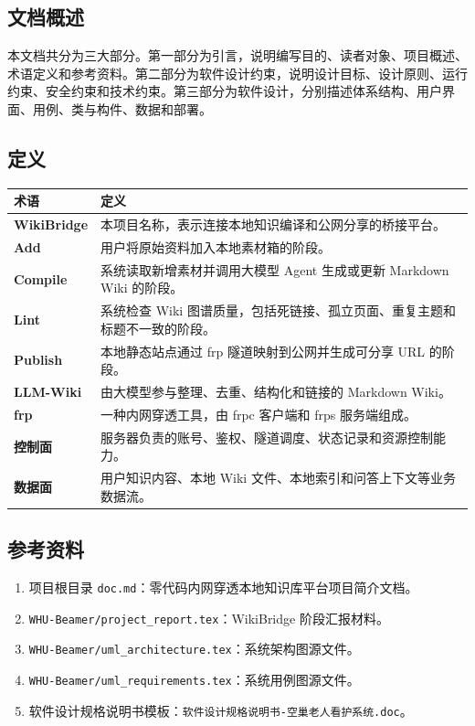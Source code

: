 \documentclass[UTF8,a4paper,12pt,fontset=fandol]{ctexart}
\newcommand{\code}[1]{\texttt{\footnotesize #1}}
\begin{document}
\subsection{文档概述}
本文档共分为三大部分。第一部分为引言，说明编写目的、读者对象、项目概述、术语定义和参考资料。第二部分为软件设计约束，说明设计目标、设计原则、运行约束、安全约束和技术约束。第三部分为软件设计，分别描述体系结构、用户界面、用例、类与构件、数据和部署。

\subsection{定义}
\begin{longtable}{>{\bfseries}p{3.2cm}p{11.0cm}}
\toprule
术语 & 定义 \\
\midrule
WikiBridge & 本项目名称，表示连接本地知识编译和公网分享的桥接平台。 \\
Add & 用户将原始资料加入本地素材箱的阶段。 \\
Compile & 系统读取新增素材并调用大模型 Agent 生成或更新 Markdown Wiki 的阶段。 \\
Lint & 系统检查 Wiki 图谱质量，包括死链接、孤立页面、重复主题和标题不一致的阶段。 \\
Publish & 本地静态站点通过 frp 隧道映射到公网并生成可分享 URL 的阶段。 \\
LLM-Wiki & 由大模型参与整理、去重、结构化和链接的 Markdown Wiki。 \\
frp & 一种内网穿透工具，由 frpc 客户端和 frps 服务端组成。 \\
控制面 & 服务器负责的账号、鉴权、隧道调度、状态记录和资源控制能力。 \\
数据面 & 用户知识内容、本地 Wiki 文件、本地索引和问答上下文等业务数据流。 \\
\bottomrule
\end{longtable}

\subsection{参考资料}
\begin{enumerate}
  \item 项目根目录 \code{doc.md}：零代码内网穿透本地知识库平台项目简介文档。
  \item \code{WHU-Beamer/project\_report.tex}：WikiBridge 阶段汇报材料。
  \item \code{WHU-Beamer/uml\_architecture.tex}：系统架构图源文件。
  \item \code{WHU-Beamer/uml\_requirements.tex}：系统用例图源文件。
  \item 软件设计规格说明书模板：\code{软件设计规格说明书-空巢老人看护系统.doc}。
\end{enumerate}
\end{document}
